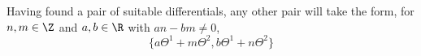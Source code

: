 Having found a pair of suitable differentials, any other pair will take the form, for $n,m\in\Z$ and $a,b\in\R$ with $an-bm\neq 0$,
\[
\{aΘ^1 + m Θ^2, bΘ^1 + n Θ^2 \}
\]



































